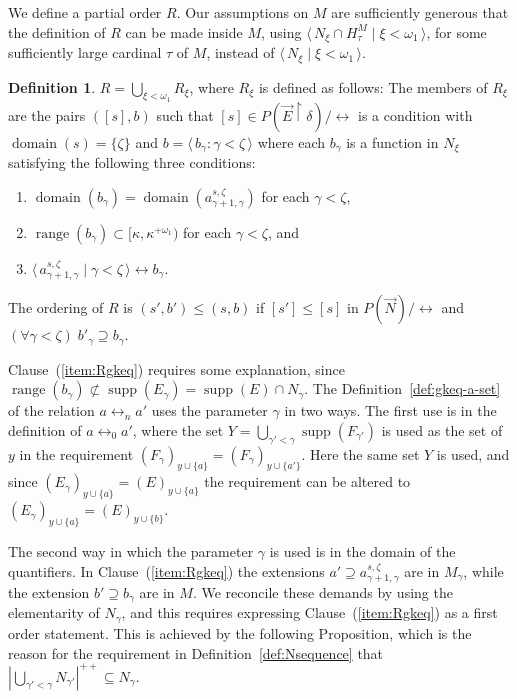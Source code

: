 \documentclass[
twoside,
]{article}
\theoremstyle{definition}
\newtheorem{definition}[theorem]{Definition}
\theoremstyle{remark}
\newcommand{\ufFromExt}[2]{(#1)_{#2}}
\DeclareMathOperator{\supp}{supp}   %
\newcommand\gkeq{\leftrightarrow}
\newcommand\mgkeq{/{\gkeq}}
\newcommand{\sing}[1]{\{#1\}}
\newcommand{\pair}[1]{\langle#1\rangle}
\newcommand{\seq}[1]{\pair{\,#1\,}}
\newcommand{\card}[1]{|#1|}
\newcommand{\restrict}{{\upharpoonright}}
\DeclareMathOperator{\range}{range}
\DeclareMathOperator{\domain}{domain}
\begin{document}
  We define a partial order $R$.   Our assumptions on $M$ are
  sufficiently generous that the definition of $R$ can be made inside
  $M$, using $\seq{N_{\xi}\cap H^{M}_{\tau}\mid \xi<\omega_1}$, for
  some sufficiently large cardinal $\tau$ of $M$, instead
  of $\seq{N_{\xi}\mid\xi<\omega_1}$.

  \begin{definition}
    $R=\bigcup_{\xi<\omega_1} R_{\xi}$, where $R_{\xi}$ is defined as
    follows: The members of $R_{\xi}$ are the pairs $([s],b)$ such that
    $[s]\in P(\vec E\restrict\delta)\mgkeq$ is a condition with $\domain(s)=\sing{\zeta}$ and
    $b=\seq{b_\gamma:\gamma<\zeta}$ where each $b_{\gamma{}}$ is a
    function in $N_{\xi}$ satisfying the following three conditions:
    \begin{enumerate}
    \item $\domain(b_\gamma)=\domain(a^{s,\zeta}_{\gamma+1,\gamma})$ for each
      $\gamma<\zeta$,
    \item $\range(b_\gamma)\subset [\kappa, \kappa^{+\omega_1})$ for each
      $\gamma<\zeta$, and
    \item \label{item:Rgkeq}
      $\seq{a^{s,\zeta}_{\gamma+1,\gamma}\mid \gamma<\zeta}\gkeq  b_{\gamma}$.
    \end{enumerate}
    The ordering of $R$ is $(s',b')\leq(s,b)$ if $[s']\leq [s]$ in $P(\vec
    N)\mgkeq$ and $(\forall\gamma<\zeta)\; b'_\gamma\supseteq
    b_\gamma$.  
  \end{definition}

  Clause~(\ref{item:Rgkeq}) requires some explanation, since
  $\range(b_{\gamma})\nsubset \supp(E_\gamma)=\supp(E)\cap N_\gamma$.
  The Definition~\ref{def:gkeq-a-set}   of  the relation
  $a\gkeq_n a'$ uses the parameter $\gamma$ in two ways.
  The first use is in the definition of $a\gkeq_{0}a'$, where the set
  $Y=\bigcup_{\gamma'<\gamma}\supp(F_{\gamma'})$ is used as the set of
  $y$ in the requirement
  $(F_{\gamma})_{y\cup\sing{a}}=(F_{\gamma})_{y\cup\sing{a'}}$.
  Here the same set $Y$ is used, and since
  $\ufFromExt{E_\gamma}{y\cup\sing{a}}=\ufFromExt{E}{y\cup\sing a}$
  the requirement can be altered to 
  $\ufFromExt{E_{\gamma}}{y\cup\sing{a}}=\ufFromExt{E}{y\cup
    \sing{b}}$. 

  The second way in which the parameter $\gamma$ is used is in the
  domain of the quantifiers.   In Clause~(\ref{item:Rgkeq}) the
  extensions $a'\supseteq a^{s,\zeta}_{\gamma+1,\gamma}$ are in
  $M_{\gamma}$, while the extension $b'\supseteq b_{\gamma}$ are in
  $M$.   We reconcile these demands by using the elementarity of
  $N_{\gamma}$, and this requires expressing Clause~(\ref{item:Rgkeq})
  as a first order statement.  This is achieved by the following
  Proposition, which is the reason for the requirement in
  Definition~\ref{def:Nsequence} that
  $\card{\bigcup_{\gamma'<\gamma}N_{\gamma'}}^{++}\subseteq N_\gamma$.  
\end{document}
